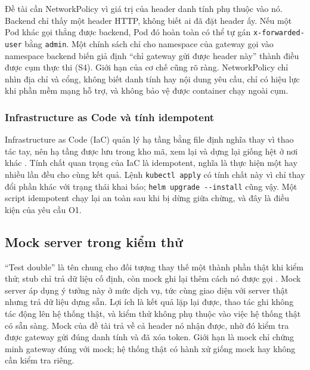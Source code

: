 Đề tài cần NetworkPolicy vì giá trị của header danh tính phụ thuộc vào nó. Backend chỉ thấy một header HTTP, không biết ai đã đặt header ấy. Nếu một Pod khác gọi thẳng được backend, Pod đó hoàn toàn có thể tự gán \texttt{x-forwarded-user} bằng \texttt{admin}. Một chính sách chỉ cho namespace của gateway gọi vào namespace backend biến giả định ``chỉ gateway gửi được header này'' thành điều được cụm thực thi (S4). Giới hạn của cơ chế cũng rõ ràng. NetworkPolicy chỉ nhìn địa chỉ và cổng, không biết danh tính hay nội dung yêu cầu, chỉ có hiệu lực khi phần mềm mạng hỗ trợ, và không bảo vệ được container chạy ngoài cụm.

\subsubsection{Infrastructure as Code và tính idempotent}

Infrastructure as Code (IaC) quản lý hạ tầng bằng file định nghĩa thay vì thao tác tay, nên hạ tầng được lưu trong kho mã, xem lại và dựng lại giống hệt ở nơi khác \parencite{morris2020iac}. Tính chất quan trọng của IaC là idempotent, nghĩa là thực hiện một hay nhiều lần đều cho cùng kết quả. Lệnh \texttt{kubectl apply} có tính chất này vì chỉ thay đổi phần khác với trạng thái khai báo; \texttt{helm upgrade -{}-install} cũng vậy. Một script idempotent chạy lại an toàn sau khi bị dừng giữa chừng, và đây là điều kiện của yêu cầu O1.

\subsection{Mock server trong kiểm thử}\label{sec:ch3-mock}

``Test double'' là tên chung cho đối tượng thay thế một thành phần thật khi kiểm thử; stub chỉ trả dữ liệu cố định, còn mock ghi lại thêm cách nó được gọi \parencite{fowler_mocks}. Mock server áp dụng ý tưởng này ở mức dịch vụ, tức cùng giao diện với server thật nhưng trả dữ liệu dựng sẵn. Lợi ích là kết quả lặp lại được, thao tác ghi không tác động lên hệ thống thật, và kiểm thử không phụ thuộc vào việc hệ thống thật có sẵn sàng. Mock của đề tài trả về cả header nó nhận được, nhờ đó kiểm tra được gateway gửi đúng danh tính và đã xóa token. Giới hạn là mock chỉ chứng minh gateway đúng với mock; hệ thống thật có hành xử giống mock hay không cần kiểm tra riêng.

